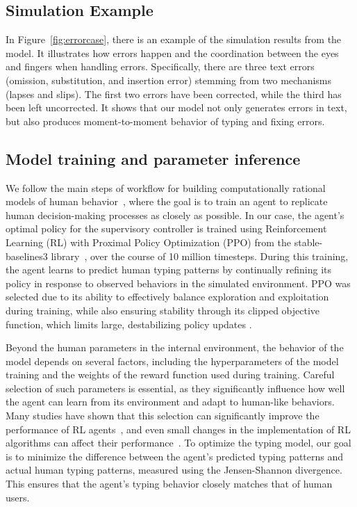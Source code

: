 \subsection{Simulation Example}

In Figure~\ref{fig:errorcase}, there is an example of the simulation results from the model. It illustrates how errors happen and the coordination between the eyes and fingers when handling errors.
Specifically, there are three text errors (omission, substitution, and insertion error) stemming from two mechanisms (lapses and slips). The first two errors have been corrected, while the third has been left uncorrected.
It shows that our model not only generates errors in text, but also produces moment-to-moment behavior of typing and fixing errors.

\subsection{Model training and parameter inference}
\label{sec:optimization}
We follow the main steps of workflow for building computationally rational models of human behavior~\cite{chandramouli2024workflow}, where the goal is to train an agent to replicate human decision-making processes as closely as possible. In our case, the agent’s optimal policy for the supervisory controller is trained using Reinforcement Learning (RL) with Proximal Policy Optimization (PPO) from the stable-baselines3 library~\cite{schulman2017proximal}, over the course of 10 million timesteps. During this training, the agent learns to predict human typing patterns by continually refining its policy in response to observed behaviors in the simulated environment. PPO was selected due to its ability to effectively balance exploration and exploitation during training, while also ensuring stability through its clipped objective function, which limits large, destabilizing policy updates \cite{schulman_proximal_2017}.

Beyond the human parameters in the internal environment, the behavior of the model depends on several factors, including the hyperparameters of the model training and the weights of the reward function used during training. Careful selection of such parameters is essential, as they significantly influence how well the agent can learn from its environment and adapt to human-like behaviors. Many studies have shown that this selection can significantly improve the performance of RL agents~\cite{andrychowicz_what_2020, paine_hyperparameter_2020, yang_efficient_2021}, and even small changes in the implementation of RL algorithms can affect their performance~\cite{engstrom_implementation_2020}. To optimize the typing model, our goal is to minimize the difference between the agent's predicted typing patterns and actual human typing patterns, measured using the Jensen-Shannon divergence. This ensures that the agent's typing behavior closely matches that of human users.

